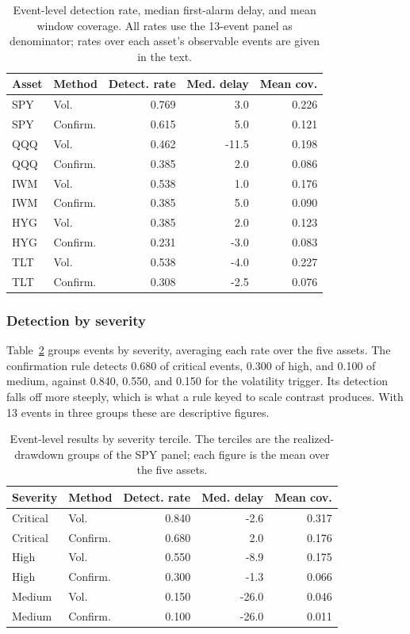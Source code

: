 \documentclass[pdflatex,sn-mathphys-num,iicol]{sn-jnl}
\begin{document}
\begin{table}[t]
\centering
\caption{Event-level detection rate, median first-alarm delay, and mean window coverage. All rates use the 13-event panel as denominator; rates over each asset's observable events are given in the text.}
\label{tab:multiasset_event_level}
\scriptsize
\begin{tabular}{llrrr}
\toprule
Asset & Method & Detect. rate & Med. delay & Mean cov.\\
\midrule
SPY & Vol. & 0.769 & 3.0 & 0.226\\
SPY & Confirm. & 0.615 & 5.0 & 0.121\\
QQQ & Vol. & 0.462 & -11.5 & 0.198\\
QQQ & Confirm. & 0.385 & 2.0 & 0.086\\
IWM & Vol. & 0.538 & 1.0 & 0.176\\
IWM & Confirm. & 0.385 & 5.0 & 0.090\\
HYG & Vol. & 0.385 & 2.0 & 0.123\\
HYG & Confirm. & 0.231 & -3.0 & 0.083\\
TLT & Vol. & 0.538 & -4.0 & 0.227\\
TLT & Confirm. & 0.308 & -2.5 & 0.076\\
\bottomrule
\end{tabular}
\end{table}

\subsubsection{Detection by severity}
\label{sec:severity_detection}
Table~\ref{tab:event_level_severity} groups events by severity, averaging each rate over the five assets. The confirmation rule detects 0.680 of critical events, 0.300 of high, and 0.100 of medium, against 0.840, 0.550, and 0.150 for the volatility trigger. Its detection falls off more steeply, which is what a rule keyed to scale contrast produces. With 13 events in three groups these are descriptive figures.

\begin{table}[t]
\centering
\caption{Event-level results by severity tercile. The terciles are the realized-drawdown groups of the SPY panel; each figure is the mean over the five assets.}
\label{tab:event_level_severity}
\scriptsize
\begin{tabular}{llrrr}
\toprule
Severity & Method & Detect. rate & Med. delay & Mean cov.\\
\midrule
Critical & Vol. & 0.840 & -2.6 & 0.317\\
Critical & Confirm. & 0.680 & 2.0 & 0.176\\
High & Vol. & 0.550 & -8.9 & 0.175\\
High & Confirm. & 0.300 & -1.3 & 0.066\\
Medium & Vol. & 0.150 & -26.0 & 0.046\\
Medium & Confirm. & 0.100 & -26.0 & 0.011\\
\bottomrule
\end{tabular}
\end{table}
\end{document}
